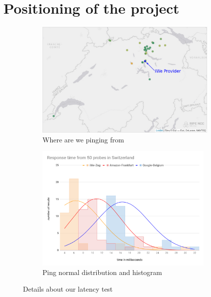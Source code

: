 \section{Positioning of the project}
\label{sec:positioning}

\begin{figure}
\centering
\begin{subfigure}{.5\textwidth}
  \centering
  \includegraphics[width=0.98\textwidth]{images/atlas-map.png}
  \vspace{-0.05in}
  \caption{Where are we pinging from}
  \vspace{0.1in}
  \label{fig:sub1}
\end{subfigure}%
\begin{subfigure}{.5\textwidth}
  \centering
  \includegraphics[width=0.96\textwidth]{images/response-time-50.png}
  \vspace{-0.05in}
  \caption{Ping normal distribution and histogram}
  \vspace{0.1in}
  \label{fig:sub2}
\end{subfigure}
  \caption{Details about our latency test}
  \label{latency}
\end{figure}

